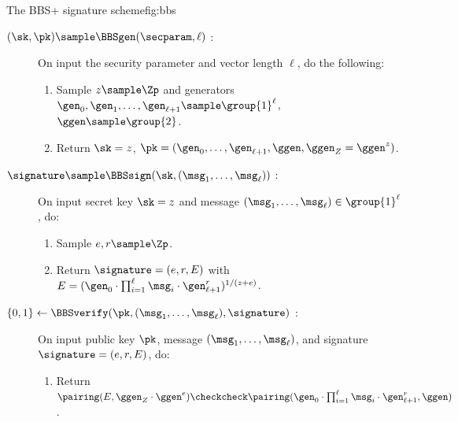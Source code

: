 \begin{primitivebox}{The BBS+ signature scheme}{fig:bbs}

  \begin{description}

    \item[$(\sk,\pk) \sample \BBSgen(\secparam, \ell)$ :] On input the security
      parameter and vector length $\ell$, do the following:

      \begin{enumerate}

        \item Sample $z \sample \Zp$ and generators $\gen_0,\gen_1, \ldots,
          \gen_{\ell+1} \sample \group{1}^\ell$, $\ggen \sample \group{2}$.

        \item Return $\sk = z$, $\pk = (\gen_0, \ldots, \gen_{\ell+1}, \ggen,
          \ggen_Z = \ggen^z)$.

      \end{enumerate}

    \item[$\signature \sample \BBSsign(\sk,(\msg_1, \ldots, \msg_\ell))$ :] On
      input secret key $\sk = z$ and message $(\msg_1, \ldots, \msg_\ell) \in
      \group{1}^\ell$, do:

      \begin{enumerate}

        \item Sample $e,r \sample \Zp$.

        \item Return $\signature = (e, r, E)$ with $E = (\gen_0 \cdot
          \prod_{i=1}^{\ell} \msg_i \cdot \gen_{\ell+1}^{r})^{1/(z+e)}$.

      \end{enumerate}

    \item[$\{0,1\} \leftarrow \BBSverify(\pk,(\msg_1, \ldots, \msg_\ell),
      \signature)$ :] On input public key $\pk$, message $(\msg_1, \ldots,
      \msg_\ell)$, and signature $\signature = (e,r,E)$, do:

      \begin{enumerate}

        \item Return $\pairing(E,\ggen_Z\cdot\ggen^{e}) \checkcheck
          \pairing(\gen_0 \cdot \prod_{i=1}^{\ell} \msg_i \cdot
          \gen_{\ell+1}^{r}, \ggen)$.

      \end{enumerate}

  \end{description}

\end{primitivebox}

